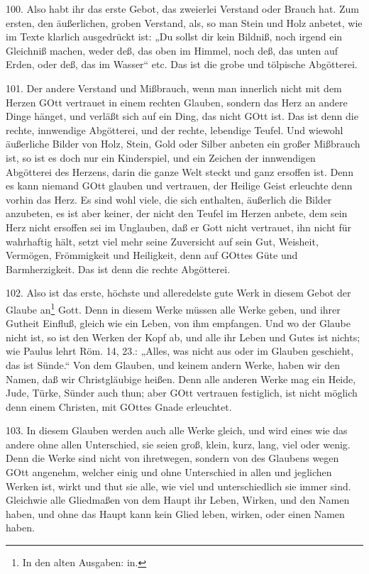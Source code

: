100. Also habt ihr das erste Gebot, das zweierlei Verstand oder Brauch hat. Zum ersten, den äußerlichen, groben Verstand, als, so man Stein und Holz anbetet, wie im Texte klarlich ausgedrückt ist: „Du sollst dir kein Bildniß, noch irgend ein Gleichniß machen, weder deß, das oben im Himmel, noch deß, das unten auf Erden, oder deß, das im Wasser“ etc. Das ist die grobe und tölpische Abgötterei.

101. Der andere Verstand und Mißbrauch, wenn man innerlich nicht mit dem Herzen GOtt vertrauet in einem rechten Glauben, sondern das Herz an andere Dinge hänget, und verläßt sich auf ein Ding, das nicht GOtt ist. Das ist denn die rechte, innwendige Abgötterei, und der rechte, lebendige Teufel. Und wiewohl äußerliche Bilder von Holz, Stein, Gold oder Silber anbeten ein großer Mißbrauch ist, so ist es doch nur ein Kinderspiel, und ein Zeichen der innwendigen Abgötterei des Herzens, darin die ganze Welt steckt und ganz ersoffen ist. Denn es kann niemand GOtt glauben und vertrauen, der Heilige Geist erleuchte denn vorhin das Herz. Es sind wohl viele, die sich enthalten, äußerlich die Bilder anzubeten, es ist aber keiner, der nicht den Teufel im Herzen anbete, dem sein Herz nicht ersoffen sei im Unglauben, daß er Gott nicht vertrauet, ihn nicht für wahrhaftig hält, setzt viel mehr seine Zuversicht auf sein Gut, Weisheit, Vermögen, Frömmigkeit und Heiligkeit, denn auf GOttes Güte und Barmherzigkeit. Das ist denn die rechte Abgötterei.

102. Also ist das erste, höchste und alleredelste gute Werk in diesem Gebot der Glaube an\footnote{In den alten Ausgaben: in.} Gott. Denn in diesem Werke müssen alle Werke geben, und ihrer Gutheit Einfluß, gleich wie ein Leben, von ihm empfangen. Und wo der Glaube nicht ist, so ist den Werken der Kopf ab, und alle ihr Leben und Gutes ist nichts; wie Paulus lehrt Röm. 14, 23.: „Alles, was nicht aus oder im Glauben geschieht, das ist Sünde.“ Von dem Glauben, und keinem andern Werke, haben wir den Namen, daß wir Christgläubige heißen. Denn alle anderen Werke mag ein Heide, Jude, Türke, Sünder auch thun; aber GOtt vertrauen festiglich, ist nicht möglich denn einem Christen, mit GOttes Gnade erleuchtet.

103. In diesem Glauben werden auch alle Werke gleich, und wird eines wie das andere ohne allen Unterschied, sie seien groß, klein, kurz, lang, viel oder wenig. Denn die Werke sind nicht von ihretwegen, sondern von des Glaubens wegen GOtt angenehm, welcher einig und ohne Unterschied in allen und jeglichen Werken ist, wirkt und thut sie alle, wie viel und unterschiedlich sie immer sind. Gleichwie alle Gliedmaßen von dem Haupt ihr Leben, Wirken, und den Namen haben, und ohne das Haupt kann kein Glied leben, wirken, oder einen Namen haben.

